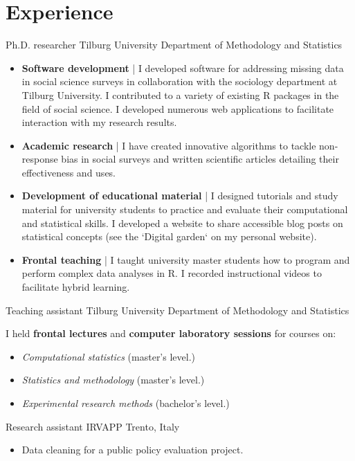 \section{Experience}

{Ph.D. researcher}
{Tilburg University} %
{} %
{Department of Methodology and Statistics}   %
{
    \vspace{0.1em}
    \begin{spacing}{1.1}
    \begin{itemize}
        \item \textbf{Software development} | I developed software for addressing missing data in social science surveys in collaboration with the sociology department at Tilburg University. I contributed to a variety of existing R packages in the field of social science. I developed numerous web applications to facilitate interaction with my research results.
        \item \textbf{Academic research} | I have created innovative algorithms to tackle non-response bias in social surveys and written scientific articles detailing their effectiveness and uses.
        \item \textbf{Development of educational material} | I designed tutorials and study material for university students to practice and evaluate their computational and statistical skills. I developed a website to share accessible blog posts on statistical concepts (see the `Digital garden` on my personal website).
        \item \textbf{Frontal teaching} | I taught university master students how to program and perform complex data analyses in R. I recorded instructional videos to facilitate hybrid learning.
    \end{itemize}
    \end{spacing}
    \vspace{1em}
}

{Teaching assistant}
{Tilburg University} %
{} %
{Department of Methodology and Statistics}   %
{
    \vspace{0.1em}
    \begin{spacing}{1.1}
    I held \textbf{frontal lectures} and \textbf{computer laboratory sessions} for courses on:
    \begin{itemize}
        \item \textit{Computational statistics} (master's level.)
		\item \textit{Statistics and methodology} (master's level.)
		\item \textit{Experimental research methods} (bachelor's level.)
    \end{itemize}
    \end{spacing}
    \vspace{1em}
}

{Research assistant}
{IRVAPP} %
{Trento, Italy} %
{}   %
{
    \vspace{0.1em}
    \begin{itemize}
        \item Data cleaning for a public policy evaluation project.
    \end{itemize}
}

